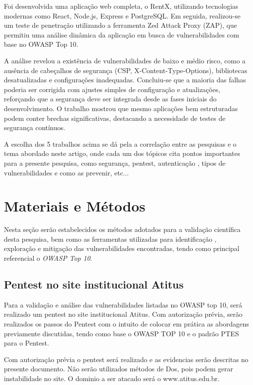 \documentclass[12pt]{article}
\begin{document}
\begin{itemize}
Foi desenvolvida uma aplicação web completa, o RentX, utilizando tecnologias modernas como React, Node.js, Express e PostgreSQL. Em seguida, realizou-se um teste de penetração utilizando 
a ferramenta Zed Attack Proxy (ZAP), que permitiu uma análise dinâmica da aplicação em busca de vulnerabilidades com base no OWASP Top 10.

A análise revelou a existência de vulnerabilidades de baixo e médio risco, como a ausência de cabeçalhos de segurança (CSP, X-Content-Type-Options), bibliotecas desatualizadas 
e configurações inadequadas. Concluiu-se que a maioria das falhas poderia ser corrigida com ajustes simples de configuração e atualizações, reforçando que a segurança deve ser 
integrada desde as fases iniciais do desenvolvimento. O trabalho mostrou que mesmo aplicações bem estruturadas podem conter brechas significativas, destacando a necessidade de 
testes de segurança contínuos.

\end{itemize}

A escolha dos 5 trabalhos acima se dá pela a correlação entre as pesquisas e o tema abordado neste artigo,
onde cada um dos tópicos cita pontos importantes para a presente pesquisa, como segurança, pentest, autenticação
, tipos de vulnerabilidades e como as prevenir, etc...

\section{Materiais e Métodos}
Nesta seção serão estabelecidos os métodos adotados para a validação científica desta pesquisa, bem como as ferramentas utilizadas para identificação
, exploração e mitigação das vulnerabilidades encontradas, tendo como principal referencial o \emph{OWASP Top 10}.

\subsection{Pentest no site institucional Atitus}
Para a validação e análise das vulnerabilidades listadas no OWASP top 10, será realizado um pentest no site institucional Atitus. 
Com autorização prévia, serão realizados os passos do Pentest com o intuito de colocar em prática as abordagens previamente discutidas,
 tendo como base o OWASP TOP 10 e o padrão PTES para o Pentest.

Com autorização prévia o pentest será realizado e as evidencias serão descritas no presente documento. 
Não serão utilizados métodos de Dos, pois podem gerar instabilidade no site. 
O dominio a ser atacado será o www.atitus.edu.br.
\end{document}
